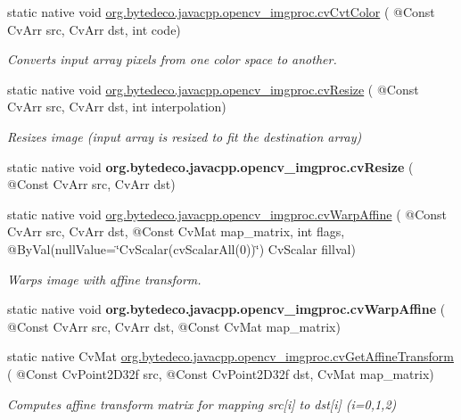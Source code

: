\begin{DoxyCompactItemize}
\item 
static native void \hyperlink{group__imgproc__c_gae45ba0b6ff1ccbe51ca42d2c6d6373bb}{org.\+bytedeco.\+javacpp.\+opencv\+\_\+imgproc.\+cv\+Cvt\+Color} ( @Const Cv\+Arr src, Cv\+Arr dst, int code)
\begin{DoxyCompactList}\small\item\em Converts input array pixels from one color space to another. \end{DoxyCompactList}\item 
static native void \hyperlink{group__imgproc__c_ga45f9e0fb1d7c7f64227f5351c8e4bb2b}{org.\+bytedeco.\+javacpp.\+opencv\+\_\+imgproc.\+cv\+Resize} ( @Const Cv\+Arr src, Cv\+Arr dst, int interpolation)
\begin{DoxyCompactList}\small\item\em Resizes image (input array is resized to fit the destination array) \end{DoxyCompactList}\item 
\mbox{\label{group__imgproc__c_gabd2ac9028a73156e80c77bcb32a8840f}} 
static native void {\bfseries org.\+bytedeco.\+javacpp.\+opencv\+\_\+imgproc.\+cv\+Resize} ( @Const Cv\+Arr src, Cv\+Arr dst)
\item 
static native void \hyperlink{group__imgproc__c_gabf1cb9d4218222026652e60bea3c8b17}{org.\+bytedeco.\+javacpp.\+opencv\+\_\+imgproc.\+cv\+Warp\+Affine} ( @Const Cv\+Arr src, Cv\+Arr dst, @Const Cv\+Mat map\+\_\+matrix, int flags, @By\+Val(null\+Value=\char`\"{}Cv\+Scalar(cv\+Scalar\+All(0))\char`\"{}) Cv\+Scalar fillval)
\begin{DoxyCompactList}\small\item\em Warps image with affine transform. \end{DoxyCompactList}\item 
\mbox{\label{group__imgproc__c_ga71cd27886ceab5e6efa99b56a80a780a}} 
static native void {\bfseries org.\+bytedeco.\+javacpp.\+opencv\+\_\+imgproc.\+cv\+Warp\+Affine} ( @Const Cv\+Arr src, Cv\+Arr dst, @Const Cv\+Mat map\+\_\+matrix)
\item 
static native Cv\+Mat \hyperlink{group__imgproc__c_ga6deb33dc741b5402e8660d553cf299c3}{org.\+bytedeco.\+javacpp.\+opencv\+\_\+imgproc.\+cv\+Get\+Affine\+Transform} ( @Const Cv\+Point2\+D32f src, @Const Cv\+Point2\+D32f dst, Cv\+Mat map\+\_\+matrix)
\begin{DoxyCompactList}\small\item\em Computes affine transform matrix for mapping src\mbox{[}i\mbox{]} to dst\mbox{[}i\mbox{]} (i=0,1,2) \end{DoxyCompactList}\item 

\end{DoxyCompactItemize}
